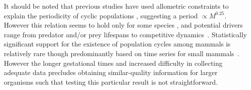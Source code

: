 \documentclass{pnastwo}
\begin{document}
\begin{article}
It should be noted that previous studies have used allometric constraints to explain the periodicity of cyclic populations \cite{CalderIII:1983jd,Peterson:1984hj,Krukonis:1991fk}, suggesting a period $\propto M^{0.25}$.
However this relation seems to hold only for some species \cite{Hendriks:2012fc}, and potential drivers range from predator and/or prey lifespans to competitive dynamics~\cite{Kendall:1999iy,Hogstedt:2005cr}.
Statistically significant support for the existence of population cycles among mammals is relatively rare though predominantly based on time series for small mammals~\cite{Kendall:1998hl}.
However the longer gestational times and increased difficulty in collecting adequate data precludes obtaining similar-quality information for larger organisms such that testing this particular result is not straightforward.\\ %


\end{article}
\end{document}
